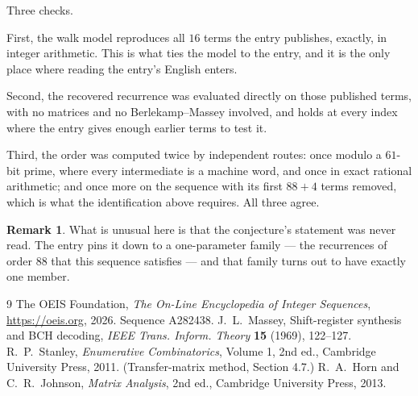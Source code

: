 \documentclass[11pt,a4paper]{article}
\theoremstyle{plain}
\theoremstyle{definition}
\newtheorem{remark}[theorem]{Remark}
\begin{document}
Three checks.

First, the walk model reproduces all $16$ terms the entry publishes, exactly, in integer
arithmetic. This is what ties the model to the entry, and it is the only place where reading
the entry's English enters.

Second, the recovered recurrence was evaluated directly on those published terms, with no
matrices and no Berlekamp--Massey involved, and holds at every index where the entry gives
enough earlier terms to test it.

Third, the order was computed twice by independent routes: once modulo a $61$-bit prime, where
every intermediate is a machine word, and once in exact rational arithmetic; and once more on
the sequence with its first $88+4$ terms removed, which is what the identification above
requires. All three agree.

\begin{remark}
What is unusual here is that the conjecture's statement was never read. The entry pins it down
to a one-parameter family --- the recurrences of order $88$ that this sequence satisfies
--- and that family turns out to have exactly one member.
\end{remark}

\begin{thebibliography}{9}
 The OEIS Foundation, \emph{The On-Line Encyclopedia of Integer
Sequences}, \url{https://oeis.org}, 2026. Sequence A282438.
 J.~L.~Massey, Shift-register synthesis and BCH decoding, \emph{IEEE
Trans. Inform. Theory} \textbf{15} (1969), 122--127.
 R.~P.~Stanley, \emph{Enumerative Combinatorics}, Volume 1, 2nd ed.,
Cambridge University Press, 2011. (Transfer-matrix method, Section 4.7.)
 R.~A.~Horn and C.~R.~Johnson, \emph{Matrix Analysis}, 2nd ed., Cambridge
University Press, 2013.
\end{thebibliography}
\end{document}
